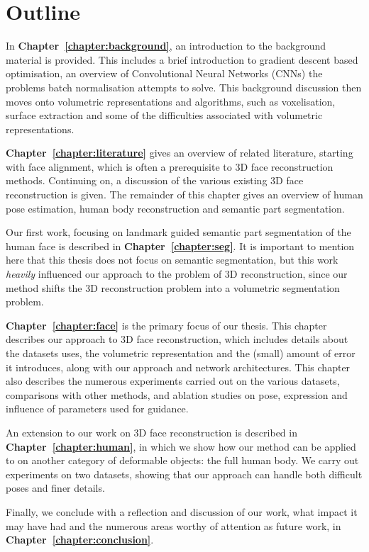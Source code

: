 \section{Outline}

In \textbf{Chapter~\ref{chapter:background}}, an introduction to the
background material is provided. This includes a brief introduction to
gradient descent based optimisation, an overview of Convolutional
Neural Networks (CNNs) the problems batch normalisation attempts to
solve. This background discussion then moves onto volumetric
representations and algorithms, such as voxelisation, surface
extraction and some of the difficulties associated with volumetric
representations.

\textbf{Chapter~\ref{chapter:literature}} gives an overview of related
literature, starting with face alignment, which is often a
prerequisite to 3D face reconstruction methods. Continuing on, a
discussion of the various existing 3D face reconstruction is
given. The remainder of this chapter gives an overview of human pose
estimation, human body reconstruction and semantic part segmentation.

Our first work, focusing on landmark guided semantic part segmentation
of the human face is described in
\textbf{Chapter~\ref{chapter:seg}}. It is important to mention here
that this thesis does not focus on semantic segmentation, but this
work \textit{heavily} influenced our approach to the problem of 3D
reconstruction, since our method shifts the 3D reconstruction problem
into a volumetric segmentation problem.

\textbf{Chapter~\ref{chapter:face}} is the primary focus of our
thesis. This chapter describes our approach to 3D face reconstruction,
which includes details about the datasets uses, the volumetric
representation and the (small) amount of error it introduces, along
with our approach and network architectures. This chapter also
describes the numerous experiments carried out on the various
datasets, comparisons with other methods, and ablation studies on
pose, expression and influence of parameters used for guidance.

An extension to our work on 3D face reconstruction is described in
\textbf{Chapter~\ref{chapter:human}}, in which we show how our method
can be applied to on another category of deformable objects: the full
human body. We carry out experiments on two datasets, showing that our
approach can handle both difficult poses and finer details.

Finally, we conclude with a reflection and discussion of our work,
what impact it may have had and the numerous areas worthy of attention
as future work, in \textbf{Chapter~\ref{chapter:conclusion}}.

